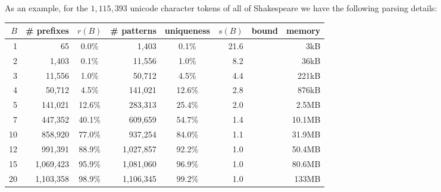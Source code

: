 \documentclass[11pt, oneside]{amsart}   	%
\begin{document}

As an example, for the $1,115,393$ unicode character tokens of all of Shakespeare we have the following parsing details:
\begin{center}
\begin{small}
\begin{tabular}{ r r c r c r r r }
 $B$ & \# prefixes & $r(B)$ & \# patterns & uniqueness & $s(B)$ &bound &  memory \\ \hline
 1 & 65 & 0.0\% & 1,403 & 0.1\% & 21.6 & & 3kB \\  
 2 & 1,403 & 0.1\% & 11,556 & 1.0\% & 8.2 & & 36kB \\  
 3 & 11,556 & 1.0\% & 50,712 & 4.5\% & 4.4 & & 221kB \\
 4 & 50,712 & 4.5\% & 141,021 & 12.6\% & 2.8 & & 876kB \\
 5 & 141,021 & 12.6\% & 283,313 & 25.4\% & 2.0 & & 2.5MB \\
 7 & 447,352 & 40.1\% & 609,659 & 54.7\% & 1.4 & & 10.1MB \\
 10 & 858,920 & 77.0\% & 937,254 & 84.0\% & 1.1 & & 31.9MB \\  
 12 & 991,391 & 88.9\% & 1,027,857 & 92.2\% & 1.0 & & 50.4MB \\
 15 & 1,069,423 & 95.9\% & 1,081,060 & 96.9\% & 1.0 & & 80.6MB \\  
 20 & 1,103,358 & 98.9\% & 1,106,345 & 99.2\% & 1.0 & & 133MB \\  \hline
\end{tabular}
\end{small}
\end{center}
\end{document}
